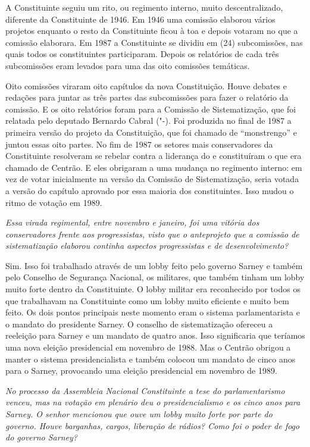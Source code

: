 A Constituinte seguiu um rito, ou regimento interno, muito
descentralizado, diferente da Constituinte de 1946. Em 1946 uma comissão
elaborou vários projetos enquanto o resto da Constituinte ficou à toa e
depois votaram no que a comissão elaborara. Em 1987 a Constituinte se
dividiu em (24) subcomissões, nas quais todos os constituintes
participaram. Depois os relatórios de cada três subcomissões eram
levados para uma das oito comissões temáticas.

Oito comissões viraram oito capítulos da nova Constituição. Houve
debates e redações para juntar as três partes das subcomissões para
fazer o relatório da comissão. E os oito relatórios foram para a
Comissão de Sistematização, que foi relatada pelo deputado Bernardo
Cabral ("-). Foi produzida no final de 1987 a primeira versão do
projeto da Constituição, que foi chamado de ``monstrengo'' e juntou
essas oito partes. No fim de 1987 os setores mais conservadores da
Constituinte resolveram se rebelar contra a liderança do  e
constituíram o que era chamado de Centrão. E eles obrigaram a uma
mudança no regimento interno: em vez de votar inicialmente na versão da
Comissão de Sistematização, seria votada a versão do capítulo aprovado
por essa maioria dos constituintes. Isso mudou o ritmo de votação em
1989.

\medskip

\noindent\emph{Essa virada regimental, entre novembro e janeiro, foi uma
vitória dos conservadores frente aos progressistas, visto que o
anteprojeto que a comissão de sistematização elaborou continha aspectos
progressistas e de desenvolvimento?}

Sim. Isso foi trabalhado através de um lobby feito
pelo governo Sarney e também pelo Conselho de Segurança Nacional, os
militares, que também tinham um lobby muito forte dentro da
Constituinte. O lobby militar era reconhecido por todos os que
trabalhavam na Constituinte como um lobby muito eficiente e muito bem
feito. Os dois pontos principais neste momento eram o sistema
parlamentarista e o mandato do presidente Sarney. O conselho de
sistematização ofereceu a reeleição para Sarney e um mandato de quatro
anos. Isso significaria que teríamos uma nova eleição presidencial em
novembro de 1988. Mas o Centrão obrigou a manter o sistema
presidencialista e também colocou um mandato de cinco anos para o
Sarney, provocando uma eleição presidencial em novembro de 1989.

\medskip

\noindent\emph{No processo da Assembleia Nacional Constituinte a tese do
parlamentarismo venceu, mas na votação em plenário deu o
presidencialismo e os cinco anos para Sarney. O senhor mencionou que
ouve um lobby muito forte por parte do governo. Houve barganhas, cargos,
liberação de rádios? Como foi o poder de fogo do governo Sarney?}

